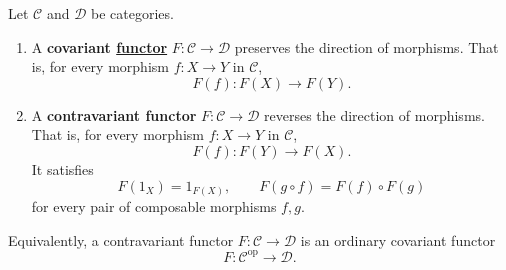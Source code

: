 	\begin{definition}
	  \label{def:covariant-and-contravariant-functors}
		Let $\mathcal C$ and $\mathcal D$ be categories.
		\begin{enumerate}
			\item A \textbf{covariant \hyperref[def:functor]{functor}}
				$F: \mathcal C \to \mathcal D$ preserves the
				direction of morphisms. That is, for every
				morphism $f: X \to Y$ in $\mathcal C$,
				\begin{equation}
					F(f): F(X) \to F(Y).
				\end{equation}

			\item A \textbf{contravariant functor}
				$F: \mathcal C \to \mathcal D$ reverses the
				direction of morphisms. That is, for every
				morphism $f: X \to Y$ in $\mathcal C$,
				\begin{equation}
					F(f): F(Y) \to F(X).
				\end{equation}
				It satisfies
				\begin{equation}
					F(1_X) = 1_{F(X)}, \qquad
					F(g \circ f) = F(f) \circ F(g)
				\end{equation}
				for every pair of composable morphisms $f,g$.
		\end{enumerate}

		Equivalently, a contravariant functor
		$F: \mathcal C \to \mathcal D$ is an ordinary
		covariant functor
		\begin{equation}
			F: \mathcal C^{\mathrm{op}} \to \mathcal D.
		\end{equation}
	\end{definition}

